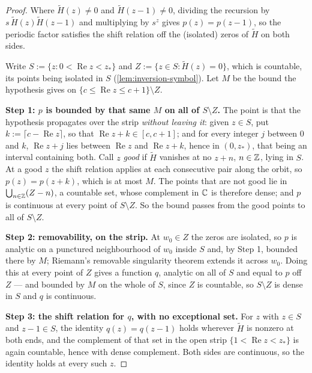 \begin{proof}
\leanok
Where $\tilde H(z) \ne 0$ and $\tilde H(z-1) \ne 0$, dividing the recursion by
$s\,\tilde H(z)\tilde H(z-1)$ and multiplying by $s^{z}$ gives $p(z) = p(z-1)$, so the periodic
factor satisfies the shift relation off the (isolated) zeros of $\tilde H$ on both sides.

Write $S := \{z : 0 < \operatorname{Re} z < z_*\}$ and $Z := \{z \in S : \tilde H(z) = 0\}$, which is
countable, its points being isolated in $S$ (\ref{lem:inversion-symbol}). Let $M$ be the bound the
hypothesis gives on $\{c \le \operatorname{Re} z \le c+1\} \setminus Z$.

\textbf{Step 1: $p$ is bounded by that same $M$ on all of $S \setminus Z$.} The point is that the
hypothesis propagates over the strip \emph{without leaving it}: given $z \in S$, put
$k := \lceil c - \operatorname{Re} z\rceil$, so that $\operatorname{Re} z + k \in [c, c+1]$; and for every
integer $j$ between $0$ and $k$, $\operatorname{Re} z + j$ lies between $\operatorname{Re} z$ and
$\operatorname{Re} z + k$, hence in $(0,z_*)$, that being an interval containing both. Call $z$
\emph{good} if $\tilde H$ vanishes at no $z + n$, $n \in \mathbb{Z}$, lying in $S$. At a good $z$ the shift
relation applies at each consecutive pair along the orbit, so $p(z) = p(z+k)$, which is at most $M$.
The points that are not good lie in $\bigcup_{n \in \mathbb{Z}}(Z - n)$, a countable set, whose complement
in $\mathbb{C}$ is therefore dense; and $p$ is continuous at every point of $S \setminus Z$. So the bound
passes from the good points to all of $S \setminus Z$.

\textbf{Step 2: removability, on the strip.} At $w_0 \in Z$ the zeros are isolated, so $p$ is
analytic on a punctured neighbourhood of $w_0$ inside $S$ and, by Step 1, bounded there by $M$;
Riemann's removable singularity theorem extends it across $w_0$. Doing this at every point of $Z$
gives a function $q$, analytic on all of $S$ and equal to $p$ off $Z$ --- and bounded by $M$ on the
whole of $S$, since $Z$ is countable, so $S \setminus Z$ is dense in $S$ and $q$ is continuous.

\textbf{Step 3: the shift relation for $q$, with no exceptional set.} For $z$ with $z \in S$ and
$z - 1 \in S$, the identity $q(z) = q(z-1)$ holds wherever $\tilde H$ is nonzero at both ends, and
the complement of that set in the open strip $\{1 < \operatorname{Re} z < z_*\}$ is again countable,
hence with dense complement. Both sides are continuous, so the identity holds at every such $z$.


\end{proof}
